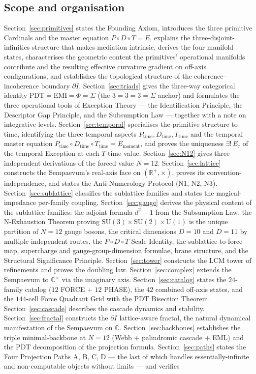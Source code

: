 \documentclass[11pt,a4paper]{article}
\theoremstyle{definition}
\theoremstyle{remark}
\newcommand{\R}{\mathbb{R}}
\newcommand{\C}{\mathbb{C}}
\begin{document}
\subsection{Scope and organisation}

Section~\ref{sec:primitives} states the Founding Axiom, introduces the three primitive Cardinals and the master equation $P\circ D\circ T = E$, explains the three-disjoint-infinities structure that makes mediation intrinsic, derives the four manifold states, characterises the geometric content the primitives' operational manifolds contribute and the resulting effective curvature gradient on off-axis configurations, and establishes the topological structure of the coherence--incoherence boundary $\partial I$. Section~\ref{sec:triads} gives the three-way categorical identity $\mathrm{PDT} = \mathrm{EMI} = \Phi = \Sigma$ (the $3=3=3=\Sigma$ anchor) and formulates the three operational tools of Exception Theory --- the Identification Principle, the Descriptor Gap Principle, and the Subsumption Law --- together with a note on integrative levels. Section~\ref{sec:temporal} specialises the primitive structure to time, identifying the three temporal aspects $P_{\text{time}}, D_{\text{time}}, T_{\text{time}}$ and the temporal master equation $P_{\text{time}} \circ D_{\text{time}} \circ T_{\text{time}} = E_{\text{moment}}$, and proves the uniqueness $\exists!\,E_{\tau}$ of the temporal Exception at each $T$-time value. Section~\ref{sec:N12} gives three independent derivations of the forced value $N=12$. Section~\ref{sec:lattice} constructs the Sempaevum's real-axis face on $(\R^{+},\times)$, proves its convention-independence, and states the Anti-Numerology Protocol (N1, N2, N3). Section~\ref{sec:sublattice} classifies the sublattice families and states the magical-impedance per-family coupling. Section~\ref{sec:gauge} derives the physical content of the sublattice families: the adjoint formula $d^{2}-1$ from the Subsumption Law, the N-Exhaustion Theorem proving $\mathrm{SU}(3)\times\mathrm{SU}(2)\times\mathrm{U}(1)$ is the unique partition of $N=12$ gauge bosons, the critical dimensions $D=10$ and $D=11$ by multiple independent routes, the $P{\circ}D{\circ}T$ Scale Identity, the sublattice-to-force map, supercharge and gauge-group-dimension formulae, brane structure, and the Structural Significance Principle. Section~\ref{sec:tower} constructs the LCM tower of refinements and proves the doubling law. Section~\ref{sec:complex} extends the Sempaevum to $\C^{\times}$ via the imaginary axis. Section~\ref{sec:catalog} states the $24$-family catalog ($12$ FORCE $+$ $12$ PHASE), the $42$ combined off-axis states, and the $144$-cell Force Quadrant Grid with the PDT Bisection Theorem. Section~\ref{sec:cascade} describes the cascade dynamics and stability. Section~\ref{sec:fractal} constructs the $\partial I$ lattice-aware fractal, the natural dynamical manifestation of the Sempaevum on $\C$. Section~\ref{sec:backbones} establishes the triple minimal-backbone at $N=12$ (Webb + palindromic cascade + EML) and the PDT decomposition of the projection formula. Section~\ref{sec:paths} states the Four Projection Paths A, B, C, D --- the last of which handles essentially-infinite and non-computable objects without limits --- and verifies 
\end{document}
